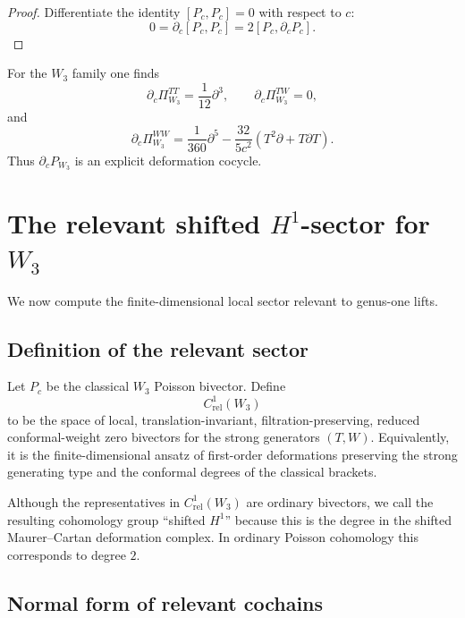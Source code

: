 \begin{proof}
Differentiate the identity $[P_c,P_c]=0$ with respect to $c$:
\[
0=\partial_c[P_c,P_c]=2[P_c,\partial_cP_c].
\]
\end{proof}

For the $W_3$ family one finds
\[
\partial_c \Pi^{TT}_{W_3}=\frac1{12}\partial^3,\qquad
\partial_c\Pi^{TW}_{W_3}=0,
\]
and
\[
\partial_c \Pi^{WW}_{W_3}
=
\frac1{360}\partial^5-\frac{32}{5c^2}(T^2\partial+T\partial T).
\]
Thus $\partial_c P_{W_3}$ is an explicit deformation cocycle.

\section{The relevant shifted $H^1$-sector for $W_3$}

We now compute the finite-dimensional local sector relevant to genus-one lifts.

\subsection{Definition of the relevant sector}

\begin{definition}
Let $P_c$ be the classical $W_3$ Poisson bivector. Define
\[
C^1_{\mathrm{rel}}(W_3)
\]
to be the space of local, translation-invariant, filtration-preserving, reduced conformal-weight
zero bivectors for the strong generators $(T,W)$. Equivalently, it is the finite-dimensional
ansatz of first-order deformations preserving the strong generating type and the conformal
degrees of the classical brackets.
\end{definition}

\begin{remark}
Although the representatives in $C^1_{\mathrm{rel}}(W_3)$ are ordinary bivectors, we call
the resulting cohomology group ``shifted $H^1$'' because this is the degree in the shifted
Maurer--Cartan deformation complex. In ordinary Poisson cohomology this corresponds to
degree $2$.
\end{remark}

\subsection{Normal form of relevant cochains}

